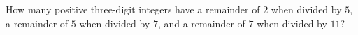 How many positive three-digit integers have a remainder of $2$ when divided by $5$, a remainder of $5$ when divided by $7$, and a remainder of $7$ when divided by $11$?
